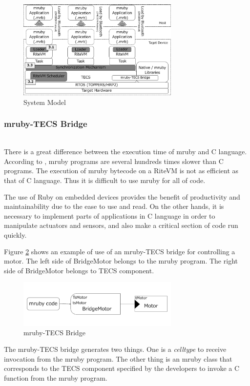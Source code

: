 \documentclass[conference,compsoc]{IEEEtran}
\begin{document}
\begin{figure}[t]
    \centering
    \includegraphics[width=8cm,clip]{figure/system_model.pdf}
    \caption{System Model}
    \label{fig:system_model}
\end{figure}

\subsubsection{mruby-TECS Bridge}\mbox{}\\

There is a great difference between the execution time of mruby and C language.
According to  \cite{7153813}, mruby programs are several hundreds times slower than C programs.
The execution of mruby bytecode on a RiteVM is not as efficient as that of C language.
Thus it is difficult to use mruby for all of code.

The use of Ruby on embedded devices provides the benefit of productivity and maintainability due to the ease to use and read.
On the other hands, it is necessary to implement parts of applications in C language in order to manipulate actuators and sensors, and also make a critical section of code run quickly.

Figure \ref{fig:mruby_TECS_bridge} shows an example of use of an mruby-TECS bridge for controlling a motor.
The left side of BridgeMotor belongs to the mruby program.
The right side of BridgeMotor belongs to TECS component.
\begin{figure}[t]
    \centering
    \includegraphics[width=8cm,clip]{figure/mruby_TECS_bridge.pdf}
    \caption{mruby-TECS Bridge}
    \label{fig:mruby_TECS_bridge}
\end{figure}

The mruby-TECS bridge generates two things.
One is a {\it celltype} to receive invocation from the mruby program.
The other thing is an mruby class that corresponds to the TECS component specified by the developers to invoke a C function from the mruby program.
\end{document}
